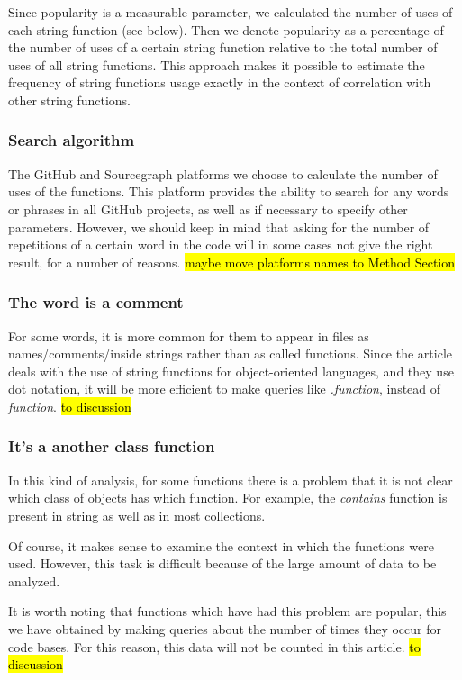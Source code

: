 \documentclass[anonymous,sigplan,review,11pt,nonacm,natbib=false]{acmart}
\begin{document}
    Since popularity is a measurable parameter, we calculated the number of uses of each string function (see below). Then we denote popularity as a percentage of the number of uses of a certain string function relative to the total number of uses of all string functions. This approach makes it possible to estimate the frequency of string functions usage exactly in the context of correlation with other string functions.

    \subsubsection{Search algorithm}

    The GitHub and Sourcegraph platforms we choose to calculate the number of uses of the functions. This platform provides the ability to search for any words or phrases in all GitHub projects, as well as if necessary to specify other parameters. However, we should keep in mind that asking for the number of repetitions of a certain word in the code will in some cases not give the right result, for a number of reasons. \hl{maybe move platforms names to Method Section}

    \subsubsection{The word is a comment}

    For some words, it is more common for them to appear in files as names/comments/inside strings rather than as called functions. Since the article deals with the use of string functions for object-oriented languages, and they use dot notation, it will be more efficient to make queries like \textit{.function}, instead of \textit{function}. \hl{to discussion}

    \subsubsection{It's a another class function}

    In this kind of analysis, for some functions there is a problem that it is not clear which class of objects has which function. For example, the \textit{contains} function is present in string as well as in most collections.

    Of course, it makes sense to examine the context in which the functions were used. However, this task is difficult because of the large amount of data to be analyzed.

    It is worth noting that functions which have had this problem are popular, this we have obtained by making queries about the number of times they occur for code bases. For this reason, this data will not be counted in this article. \hl{to discussion}
\end{document}
